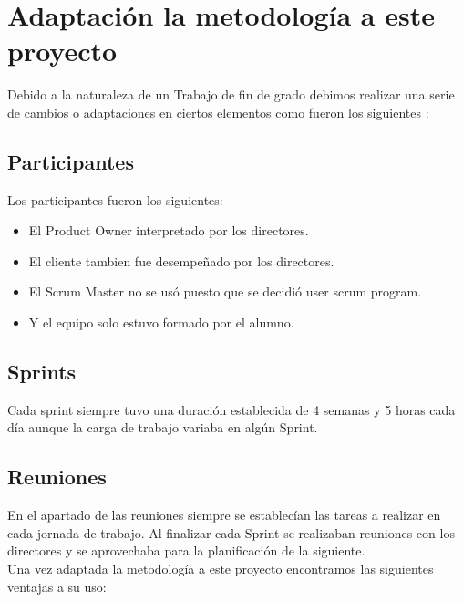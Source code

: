 \section{Adaptación la metodología a este proyecto }
 Debido a la naturaleza de un Trabajo de fin de grado  debimos realizar una serie de cambios o adaptaciones en ciertos elementos como fueron los siguientes :
\subsection{Participantes}
Los participantes fueron los siguientes:
\begin{itemize}
\item El Product Owner interpretado por los  directores.
\item El cliente tambien fue desempeñado por los directores.
\item El Scrum Master no se usó puesto que se decidió 
 user scrum program.
\item  Y el equipo solo estuvo formado por el alumno.

\end{itemize}

\subsection{Sprints}
Cada sprint siempre tuvo una duración establecida de 4 semanas y 5 horas cada día aunque la carga de trabajo variaba en algún Sprint.


\subsection{Reuniones}

En el apartado de las reuniones siempre se establecían las tareas a realizar en cada jornada de trabajo. Al finalizar cada Sprint se realizaban reuniones con los directores y se aprovechaba para la planificación de la siguiente.\\

Una vez adaptada la metodología a este proyecto encontramos las siguientes ventajas a su uso:

